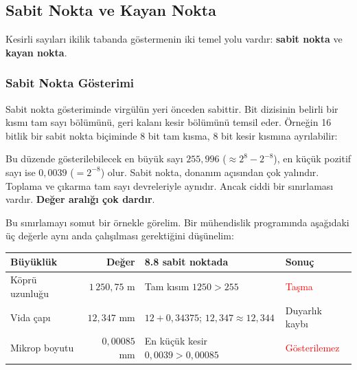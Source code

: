 \subsection{Sabit Nokta ve Kayan Nokta}
\label{sec:sabit-kayan}

Kesirli sayıları ikilik tabanda göstermenin iki temel yolu vardır: \textbf{sabit nokta} ve \textbf{kayan nokta}.

\subsubsection{Sabit Nokta Gösterimi}

Sabit nokta gösteriminde virgülün yeri önceden sabittir. Bit dizisinin belirli bir kısmı tam sayı bölümünü, geri kalanı kesir bölümünü temsil eder. Örneğin 16 bitlik bir sabit nokta biçiminde 8 bit tam kısma, 8 bit kesir kısmına ayrılabilir:

\begin{center}
\end{center}

Bu düzende gösterilebilecek en büyük sayı $255{,}996$ ($\approx 2^8 - 2^{-8}$), en küçük pozitif sayı ise $0{,}0039$ ($= 2^{-8}$) olur. Sabit nokta, donanım açısından çok yalındır. Toplama ve çıkarma tam sayı devreleriyle aynıdır. Ancak ciddi bir sınırlaması vardır. \textbf{Değer aralığı çok dardır}.

Bu sınırlamayı somut bir örnekle görelim. Bir mühendislik programında aşağıdaki üç değerle aynı anda çalışılması gerektiğini düşünelim:

\begin{center}
\small
\begin{tabularx}{\textwidth}{l r X l}
\toprule
\textbf{Büyüklük} & \textbf{Değer} & \textbf{8.8 sabit noktada} & \textbf{Sonuç} \\
\midrule
Köprü uzunluğu & $1\,250{,}75$ m & Tam kısım $1250 > 255$ & \textcolor{red}{Taşma} \\[3pt]
Vida çapı & $12{,}347$ mm & $12 + 0{,}34375$; $12{,}347 \approx 12{,}344$ & Duyarlık kaybı \\[3pt]
Mikrop boyutu & $0{,}00085$ mm & En küçük kesir $0{,}0039 > 0{,}00085$ & \textcolor{red}{Gösterilemez} \\
\bottomrule
\end{tabularx}
\end{center}

